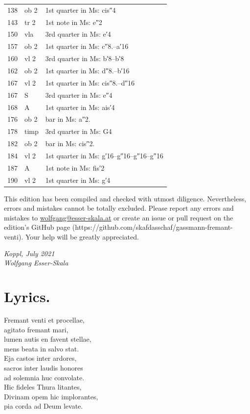\documentclass[parskip=full]{scrreprt}
\newif\iftemplate\templatetrue
\begin{document}
\begin{longtable}{ll L{10cm}}
	138   & ob 2  & 1st quarter in Ms: cis″4 \\
	143   & tr 2  & 1st note in Ms: e″2 \\
	150   & vla   & 3rd quarter in Ms: e′4 \\
	157   & ob 2  & 1st quarter in Ms: c″8.–a′16 \\
	160   & vl 2  & 3rd quarter in Ms: b′8–b′8 \\
	162   & ob 2  & 1st quarter in Ms: d″8.–b′16 \\
	167   & vl 2  & 1st quarter in Ms: cis″8.–d″16 \\
	167   & S     & 3rd quarter in Ms: e″4 \\
	168   & A     & 1st quarter in Ms: ais′4 \\
	176   & ob 2  & bar in Ms: a″2. \\
	178   & timp  & 3rd quarter in Ms: G4 \\
	182   & ob 2  & bar in Ms: cis″2. \\
	184   & vl 2  & 1st quarter in Ms: g′16–g″16–g″16–g″16 \\
	187   & A     & 1st note in Ms: fis′2 \\
	190   & vl 2  & 1st quarter in Ms: g′4 \\
	\bottomrule
\end{longtable}


This edition has been compiled and checked with utmost diligence. Nevertheless, errors and mistakes cannot be totally excluded. Please report any errors and mistakes to \url{wolfgang@esser-skala.at} or create an issue or pull request on the edition’s GitHub page (https://github.com/skafdasschaf/gassmann-fremant-venti). Your help will be greatly appreciated.

\bigskip
\textit{Koppl, July 2021\\
Wolfgang Esser-Skala}


\chapter*{Lyrics.}


Fremant venti et procellae,\\
agitato fremant mari,\\
lumen autis en favent stellae,\\
mens beata in salvo stat.\\
Eja castos inter ardores,\\
sacros inter laudis honores\\
ad solemnia huc convolate.\\
Hic fideles Thura litantes,\\
Divinam opem hic implorantes,\\
pia corda ad Deum levate.

\cleardoublepage
\fi

\iftemplate

\fi
\end{document}
